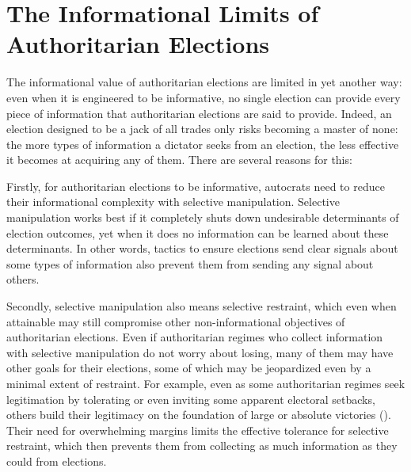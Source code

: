 \documentclass[12pt]{article}
\newcommand{\1}{\mathbbm{1}}
\begin{document}
\section{The Informational Limits of Authoritarian Elections}
\label{sec:theory_limits}

The informational value of authoritarian elections are limited in yet another way: even when it is engineered to be informative, no single election can provide every piece of information that authoritarian elections are said to provide. Indeed, an election designed to be a jack of all trades only risks becoming a master of none: the more types of information a dictator seeks from an election, the less effective it becomes at acquiring any of them. There are several reasons for this:

Firstly, for authoritarian elections to be informative, autocrats need to reduce their informational complexity with selective manipulation. Selective manipulation works best if it completely shuts down undesirable determinants of election outcomes, yet when it does no information can be learned about these determinants. In other words, tactics to ensure elections send clear signals about some types of information also prevent them from sending any signal about others.

Secondly, selective manipulation also means selective restraint, which even when attainable may still compromise other non-informational objectives of authoritarian elections. Even if authoritarian regimes who collect information with selective manipulation do not worry about losing, many of them may have other goals for their elections, some of which may be jeopardized even by a minimal extent of restraint. For example, even as some authoritarian regimes seek legitimation by tolerating or even inviting some apparent electoral setbacks, others build their legitimacy on the foundation of large or absolute victories (\citet{Morgenbesser2016, Simpser2013, Geddes2018}). Their need for overwhelming margins limits the effective tolerance for selective restraint, which then prevents them from collecting as much information as they could from elections.
\end{document}
